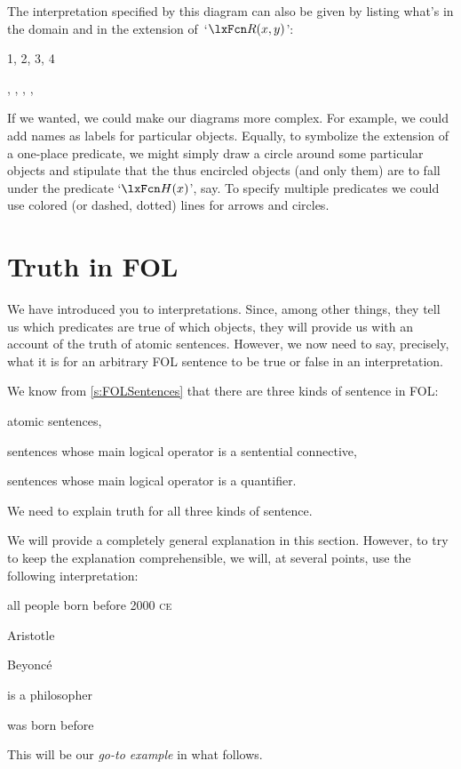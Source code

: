 The interpretation specified by this diagram can also be given by listing what's in the domain and in the extension of~`$\atom{R}{x,y}$':
	\begin{ekey}
	\item[\text{domain}] 1, 2, 3, 4
	\item[R(x,y)] , 
		, 
		, 
		,
	\end{ekey}
If we wanted, we could make our diagrams more complex. For example, we could add names as labels for particular objects. Equally, to symbolize the extension of a one-place predicate, we might simply draw a circle around some particular objects and stipulate that the thus encircled objects (and only them) are to fall under the predicate `$\atom{H}{x}$', say. To specify multiple predicates we could use colored (or dashed, dotted) lines for arrows and circles.


\chapter{Truth in FOL}\label{s:TruthFOL}
We have introduced you to interpretations. Since, among other things, they tell us which predicates are true of which objects, they will provide us with an account of the truth of atomic sentences. However, we now need to say, precisely, what it is for an arbitrary FOL sentence to be true or false in an interpretation.

We know from \cref{s:FOLSentences} that there are three kinds of sentence in FOL: 
	\begin{compactlist}
		\item atomic sentences,
		\item sentences whose main logical operator is a sentential connective,
		\item sentences whose main logical operator is a quantifier.
	\end{compactlist}
We need to explain truth for all three kinds of sentence.

We will provide a completely general explanation in this section. However, to try to keep the explanation comprehensible, we will, at several points, use the following interpretation:
	\begin{ekey}
		\item[\text{domain}] all people born before 2000 \textsc{ce}
		\item[a] Aristotle
		\item[b] Beyonc\'e
		\item[\atom{P}{x}]  is a philosopher
		\item[\atom{R}{x,y}]  was born before \gap{y}
	\end{ekey}
This will be our \emph{go-to example} in what follows.

